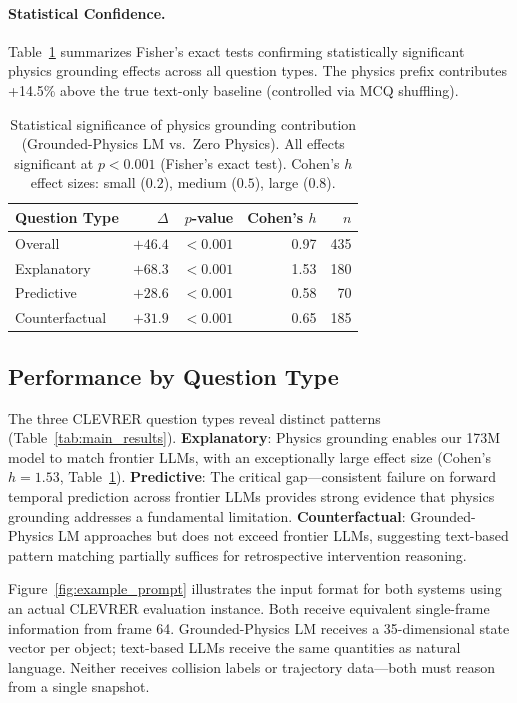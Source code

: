 \documentclass[conference]{IEEEtran}
\theoremstyle{plain}
\theoremstyle{definition}
\theoremstyle{remark}
\begin{document}
\paragraph{Statistical Confidence.} Table~\ref{tab:significance} summarizes Fisher's exact tests confirming statistically significant physics grounding effects across all question types. The physics prefix contributes +14.5\% above the true text-only baseline (controlled via MCQ shuffling).

\begin{table}[h]
\centering
\footnotesize
\begin{tabular*}{\columnwidth}{@{\extracolsep{\fill}}lrrrr@{}}
\toprule
\textbf{Question Type} & \textbf{$\Delta$} & \textbf{$p$-value} & \textbf{Cohen's $h$} & \textbf{$n$} \\
\midrule
Overall & $+46.4$ & $<0.001$ & 0.97 & 435 \\
Explanatory & $+68.3$ & $<0.001$ & 1.53 & 180 \\
Predictive & $+28.6$ & $<0.001$ & 0.58 & 70 \\
Counterfactual & $+31.9$ & $<0.001$ & 0.65 & 185 \\
\bottomrule
\end{tabular*}
\caption{Statistical significance of physics grounding contribution (Grounded-Physics LM vs.\ Zero Physics). All effects significant at $p<0.001$ (Fisher's exact test). Cohen's $h$ effect sizes: small ($0.2$), medium ($0.5$), large ($0.8$).}
\label{tab:significance}
\end{table}

\subsection{Performance by Question Type}

The three CLEVRER question types reveal distinct patterns (Table~\ref{tab:main_results}). \textbf{Explanatory}: Physics grounding enables our 173M model to match frontier LLMs, with an exceptionally large effect size (Cohen's $h=1.53$, Table~\ref{tab:significance}). \textbf{Predictive}: The critical gap---consistent failure on forward temporal prediction across frontier LLMs provides strong evidence that physics grounding addresses a fundamental limitation. \textbf{Counterfactual}: Grounded-Physics LM approaches but does not exceed frontier LLMs, suggesting text-based pattern matching partially suffices for retrospective intervention reasoning.

Figure~\ref{fig:example_prompt} illustrates the input format for both systems using an actual CLEVRER evaluation instance. Both receive equivalent single-frame information from frame 64. Grounded-Physics LM receives a 35-dimensional state vector per object; text-based LLMs receive the same quantities as natural language. Neither receives collision labels or trajectory data---both must reason from a single snapshot.
\end{document}
